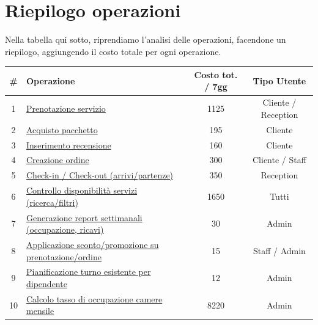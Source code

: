 \documentclass[a4paper,12pt]{report}
\begin{document}
\newpage
\section{Riepilogo operazioni}
Nella tabella qui sotto, riprendiamo l'analisi delle operazioni, facendone un riepilogo, aggiungendo
il costo totale per ogni operazione.
\begin{table}[H]
	\centering
	\small
	\renewcommand{\arraystretch}{1.12}
	\begin{tabularx}{\textwidth}{|c|>{\raggedright\arraybackslash}X|c|c|}
		\hline
		\rowcolor{gray!20}
		\textbf{\#} & \textbf{Operazione}                                                   & \textbf{Costo tot. / 7gg} & \textbf{Tipo Utente} \\
		\hline
		1           & \hyperref[op1]{Prenotazione servizio}                                 & 1125                      & Cliente / Reception  \\
		\hline
		2           & \hyperref[op2]{Acquisto pacchetto}                                    & 195                       & Cliente              \\
		\hline
		3           & \hyperref[op3]{Inserimento recensione}                                & 160                       & Cliente              \\
		\hline
		4           & \hyperref[op4]{Creazione ordine}                                      & 300                       & Cliente / Staff      \\
		\hline
		5           & \hyperref[op5]{Check-in / Check-out (arrivi/partenze)}                & 350                       & Reception            \\
		\hline
		6           & \hyperref[op6]{Controllo disponibilità servizi (ricerca/filtri)}      & 1650                      & Tutti                \\
		\hline
		7           & \hyperref[op7]{Generazione report settimanali (occupazione, ricavi)}  & 30                        & Admin                \\
		\hline
		8           & \hyperref[op8]{Applicazione sconto/promozione su prenotazione/ordine} & 15                        & Staff / Admin        \\
		\hline
		9           & \hyperref[op9]{Pianificazione turno esistente per dipendente}         & 12                        & Admin                \\
		\hline
		10          & \hyperref[op10]{Calcolo tasso di occupazione camere mensile}          & 8220                      & Admin                \\

\end{tabularx}
\end{table}
\end{document}
